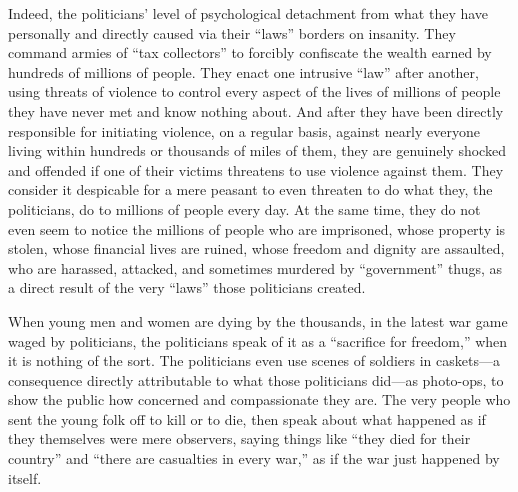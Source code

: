 \documentclass{book}
\begin{document}
Indeed, the politicians' level of psychological detachment from what they have personally and directly caused via their \enquote{laws} borders on insanity. They command armies of \enquote{tax collectors} to forcibly confiscate the wealth earned by hundreds of millions of people. They enact one intrusive \enquote{law} after another, using threats of violence to control every aspect of the lives of millions of people they have never met and know nothing about. And after they have been directly responsible for initiating violence, on a regular basis, against nearly everyone living within hundreds or thousands of miles of them, they are genuinely shocked and offended if one of their victims threatens to use violence against them. They consider it despicable for a mere peasant to even threaten to do what they, the politicians, do to millions of people every day. At the same time, they do not even seem to notice the millions of people who are imprisoned, whose property is stolen, whose financial lives are ruined, whose freedom and dignity are assaulted, who are harassed, attacked, and sometimes murdered by \enquote{government} thugs, as a direct result of the very \enquote{laws} those politicians created.

When young men and women are dying by the thousands, in the latest war game waged by politicians, the politicians speak of it as a \enquote{sacrifice for freedom,} when it is nothing of the sort. The politicians even use scenes of soldiers in caskets---a consequence directly attributable to what those politicians did---as photo-ops, to show the public how concerned and compassionate they are. The very people who sent the young folk off to kill or to die, then speak about what happened as if they themselves were mere observers, saying things like \enquote{they died for their country} and \enquote{there are casualties in every war,} as if the war just happened by itself.
\end{document}
